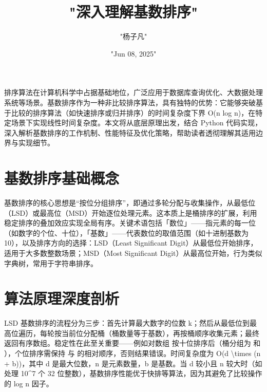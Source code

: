 \title{"深入理解基数排序"}
\author{"杨子凡"}
\date{"Jun 08, 2025"}
\maketitle
排序算法在计算机科学中占据基础地位，广泛应用于数据库查询优化、大数据处理系统等场景。基数排序作为一种非比较排序算法，具有独特的优势：它能够突破基于比较的排序算法（如快速排序或归并排序）的时间复杂度下界 O(n log n)，在特定场景下实现线性时间复杂度。本文将从底层原理出发，结合 Python 代码实现，深入解析基数排序的工作机制、性能特征及优化策略，帮助读者透彻理解其适用边界与实现细节。\par
\chapter{基数排序基础概念}
基数排序的核心思想是“按位分组排序”，即通过多轮分配与收集操作，从最低位（LSD）或最高位（MSD）开始逐位处理元素。这本质上是桶排序的扩展，利用稳定排序的叠加效应实现全局有序。关键术语包括「数位」——指元素的每一位（如数字的个位、十位），「基数」——代表数位的取值范围（如十进制基数为 10），以及排序方向的选择：LSD（Least Significant Digit）从最低位开始排序，适用于大多数整数场景；MSD（Most Significant Digit）从最高位开始，行为类似字典树，常用于字符串排序。\par
\chapter{算法原理深度剖析}
LSD 基数排序的流程分为三步：首先计算最大数字的位数 k；然后从最低位到最高位遍历，每轮按当前位分配桶（桶数量等于基数），再按桶顺序收集元素；最终返回有序数组。稳定性在此至关重要——例如对数组 \InlineCode{[21, 15, 12]} 按十位排序后（桶分组为 \InlineCode{[12]} 和 \InlineCode{[21, 15]}），个位排序需保持  与  的相对顺序，否则结果错误。时间复杂度为 O(d \textbackslash{}times (n + b))，其中 d 是最大位数，n 是元素数量，b 是基数。当 d 较小且 n 较大时（如处理 10\^{}7 个 32 位整数），基数排序性能优于快排等算法，因为其避免了比较操作的 log n 因子。\par
